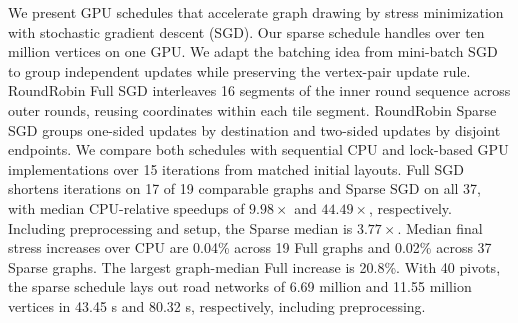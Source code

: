 We present GPU schedules that accelerate graph drawing by stress minimization with stochastic gradient descent (SGD). Our sparse schedule handles over ten million vertices on one GPU.
We adapt the batching idea from mini-batch SGD to group independent updates while preserving the vertex-pair update rule.
RoundRobin Full SGD interleaves 16 segments of the inner round sequence across outer rounds, reusing coordinates within each tile segment. RoundRobin Sparse SGD groups one-sided updates by destination and two-sided updates by disjoint endpoints.
We compare both schedules with sequential CPU and lock-based GPU implementations over 15 iterations from matched initial layouts.
Full SGD shortens iterations on 17 of 19 comparable graphs and Sparse SGD on all 37, with median CPU-relative speedups of $9.98\times$ and $44.49\times$, respectively. Including preprocessing and setup, the Sparse median is $3.77\times$.
Median final stress increases over CPU are 0.04\% across 19 Full graphs and 0.02\% across 37 Sparse graphs. The largest graph-median Full increase is 20.8\%.
With 40 pivots, the sparse schedule lays out road networks of 6.69 million and 11.55 million vertices in 43.45 s and 80.32 s, respectively, including preprocessing.
